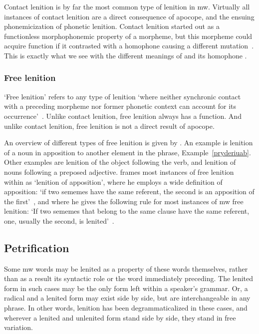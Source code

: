 Contact lenition is by far the most common type of lenition in \gls{mw}. Virtually all instances of contact lenition are a direct consequence of apocope, and the ensuing phonemicization of phonetic lenition. Contact lenition started out as a functionless morphophonemic property of a morpheme, but this morpheme could acquire function if it contrasted with a homophone causing a different mutation~\autocite[1]{schrijver_free_2010}. This is exactly what we see with the different meanings of  and its homophone .

\subsubsection{Free lenition}
\label{sec:free-lenition}
`Free lenition' refers to any type of lenition `where neither synchronic contact with a preceding morpheme nor former phonetic context can account for its occurrence'~\autocite[1]{schrijver_free_2010}. Unlike contact lenition, free lenition always has a function. And unlike contact lenition, free lenition is not a direct result of apocope. 

An overview of different types of free lenition is given by \textcite{schrijver_free_2010}. An example is lenition of a noun in apposition to another element in the phrase, \eg Example~\ref{pryderiuab}.
Other examples are lenition of the object following the verb, and lenition of nouns following a preposed adjective.
\Textcite{schrijver_free_2010} frames most instances of free lenition within as `lenition of apposition', where he employs a wide definition of apposition: `if two sememes have the same referent, the second is an apposition of the first'~\autocite[3]{schrijver_free_2010}, and where he gives the following rule for most instances of \gls{mw} free lenition: `If two sememes that belong to the same clause have the same referent, one, usually the second, is lenited'~\autocite[3]{schrijver_free_2010}.

\subsection{Petrification}
\label{sec:petrification}
Some \gls{mw} words may be lenited as a property of these words themselves, rather than as a result its syntactic role or the word immediately preceding.
The lenited form in such cases may be the only form left within a speaker's grammar.
Or, a radical and a lenited form may exist side by side, but are interchangeable in any phrase.
In other words, lenition has been degrammaticalized in these cases, and wherever a lenited and unlenited form stand side by side, they stand in free variation.

